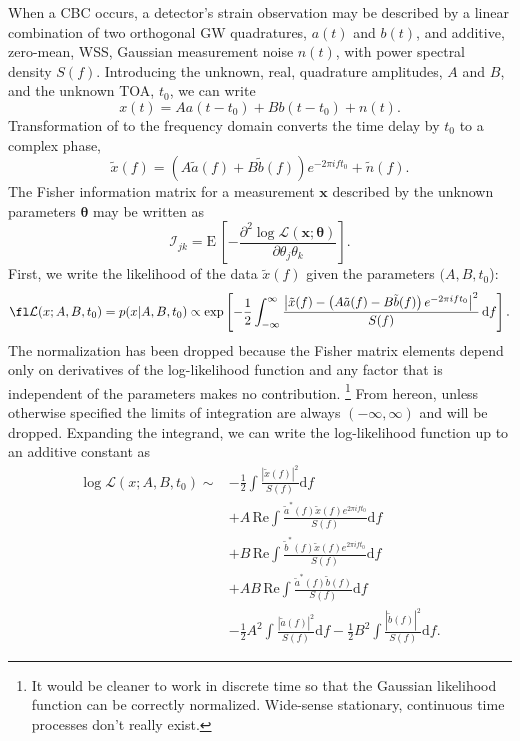 \documentclass{iopart}
\begin{document}
When a \ac{CBC} occurs, a detector's strain observation may be described by a linear combination of two orthogonal \ac{GW} quadratures, $a(t)$ and $b(t)$, and additive, zero\nobreakdashes-mean, \acl{WSS}, Gaussian measurement noise $n(t)$, with power spectral density $S(f)$.  Introducing the unknown, real, quadrature amplitudes, $A$ and $B$, and the unknown \ac{TOA}, $t_0$, we can write
%
\begin{equation}\label{eq:xoft}
	x(t) = A a(t - t_0) + B b(t - t_0) + n(t).
\end{equation}
%
Transformation of  to the frequency domain converts the time delay by $t_0$ to a complex phase,
%
\begin{equation}\label{eq:xoff}
	\tilde{x}(f) = \left(A \tilde{a}(f) + B \tilde{b}(f)\right)e^{-2 \pi i f t_0} + \tilde{n}(f).
\end{equation}
%
The Fisher information matrix for a measurement $\mathbf{x}$ described by the unknown parameters $\boldsymbol{\theta}$ may be written as
%
\begin{equation}
	\mathcal{I}_{jk} = \mathrm{E} \, \left[
		-\frac{\partial^2 \log
			\mathcal{L}(\mathbf{x}; \boldsymbol{\theta})}
			{\partial \theta_j \theta_k}
	\right].
\end{equation}
%
First, we write the likelihood of the data $\tilde{x}(f)$ given the parameters $(A, B, t_0$):
%
\begin{equation}\label{eq:trigger-likelihood}
	\fl\mathcal{L}(x; A, B, t_0) = p(x | A, B, t_0)
		\propto \exp \left[
		- \frac{1}{2} \int_{-\infty}^\infty \frac{\left|\tilde{x}(f)
			- \left(A \tilde{a}(f)
			- B \tilde{b}(f)\right) e^{-2 \pi i f t_0}\right|^2}{S(f)} \, \mathrm{d}f
	\right].
\end{equation}
%
The normalization has been dropped because the Fisher matrix elements depend only on derivatives of the log\nobreakdashes-likelihood function and any factor that is independent of the parameters makes no contribution.%
%
\footnote{It would be cleaner to work in discrete time so that the Gaussian likelihood function can be correctly normalized.  Wide-sense stationary, continuous time processes don't really exist.}
%
From hereon, unless otherwise specified the limits of integration are always $(-\infty, \infty)$ and will be dropped.  Expanding the integrand, we can write the log\nobreakdashes-likelihood function up to an additive constant as
%
\begin{eqnarray}\label{eq:trigger-likelihood}
	\log \mathcal{L}(x; A, B, t_0) \sim
	&- \frac{1}{2} \int \frac{|\tilde{x}(f)|^2}{S(f)} \mathrm{d}f \\
	&+ A \, \mathrm{Re} \int \frac{\tilde{a}^*(f) \tilde{x}(f) e^{2 \pi i f t_0}}{S(f)} \mathrm{d}f \nonumber\\
	&+ B \, \mathrm{Re} \int \frac{\tilde{b}^*(f) \tilde{x}(f) e^{2 \pi i f t_0}}{S(f)} \mathrm{d}f\nonumber\\
	&+ A B \, \mathrm{Re} \int \frac{\tilde{a}^*(f) \tilde{b}(f)}{S(f)} \mathrm{d}f \nonumber\\
	&- \frac{1}{2} A^2 \int \frac{|\tilde{a}(f)|^2}{S(f)} \mathrm{d}f
	- \frac{1}{2} B^2 \int \frac{|\tilde{b}(f)|^2}{S(f)} \mathrm{d}f.
\end{eqnarray}
\end{document}
